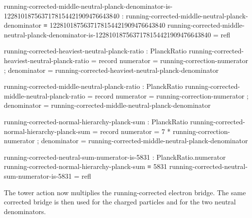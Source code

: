 \documentclass[11pt]{article}
\begin{document}
\begin{code}
running-corrected-middle-neutral-planck-denominator-is-1228101875637178154421909476643840 :
  running-corrected-middle-neutral-planck-denominator ≡
  1228101875637178154421909476643840
running-corrected-middle-neutral-planck-denominator-is-1228101875637178154421909476643840 = refl

running-corrected-heaviest-neutral-planck-ratio : PlanckRatio
running-corrected-heaviest-neutral-planck-ratio = record
  { numerator   = running-correction-numerator
  ; denominator = running-corrected-heaviest-neutral-planck-denominator
  }

running-corrected-middle-neutral-planck-ratio : PlanckRatio
running-corrected-middle-neutral-planck-ratio = record
  { numerator   = running-correction-numerator
  ; denominator = running-corrected-middle-neutral-planck-denominator
  }

running-corrected-normal-hierarchy-planck-sum : PlanckRatio
running-corrected-normal-hierarchy-planck-sum = record
  { numerator   = 7 * running-correction-numerator
  ; denominator = running-corrected-middle-neutral-planck-denominator
  }

running-corrected-neutral-sum-numerator-is-5831 :
  PlanckRatio.numerator running-corrected-normal-hierarchy-planck-sum ≡ 5831
running-corrected-neutral-sum-numerator-is-5831 = refl
\end{code}

The tower action now multiplies the running-corrected electron bridge.  The
same corrected bridge is then used for the charged particles and for the two
neutral denominators.
\end{document}
